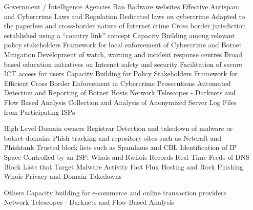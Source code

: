 
    Government / Intelligence Agencies
      Ban Badware websites
      Effective Antispam and Cybercrime Laws and Regulation
      Dedicated laws on cybercrime
      Adapted to the paperless and cross-border nature of Internet crime
      Cross border jurisdiction established using a “country link” concept
      Capacity Building among relevant policy stakeholders
      Framework for local enforcement of Cybercrime and Botnet Mitigation
      Development of watch, warning and incident response centres
      Broad based education initiatives on Internet safety and security
      Facilitation of secure ICT access for users
      Capacity Building for Policy Stakeholders
      Framework for Efficient Cross Border Enforcement in Cybercrime Prosecutions
      Automated Detection and Reporting of Botnet Hosts
      Network Telescopes - Darknets and Flow Based Analysis
      Collection and Analysis of Anonymized Server Log Files from Participating ISPs

    High Level Domain owners \/ Registrar
      Detection and takedown of malware or botnet domains
      Phish tracking and repository sites such as Netcraft and Phishtank
      Trusted block lists such as Spamhaus and CBL
      Identification of IP Space Controlled by an ISP: Whois and Rwhois Records
      Real Time Feeds of DNS Block Lists that Target Malware Activity
      Fast Flux Hosting and Rock Phishing
      Whois Privacy and Domain Takedowns

    Others
    Capacity building for e-commerce and online transaction providers
    Network Telescopes - Darknets and Flow Based Analysis
